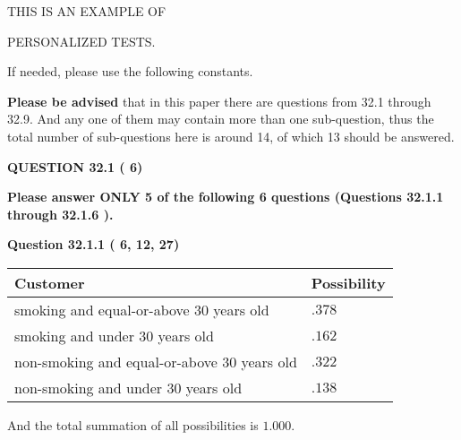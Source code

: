 \documentclass[12pt]{article}
\begin{document}
   
   
   
   
   
 \vspace{0.2in}
 
 
{\Huge  THIS IS AN EXAMPLE OF}
 
{\Huge  PERSONALIZED TESTS. }
 
If needed, please use the following constants.
 
 
 
{\textbf{\large{Please be advised}}} that in this paper there are questions from
32.1 through
32.9.
And any one of them may contain more than one sub-question, thus the total number
of sub-questions here is around 14, of which
13 should be answered.
 
\vspace{0.3in}
 
 
   
   
  
\vspace{0.2in}
  
{\textbf{\Large{QUESTION
32.1 
 (          6)
}}}
  
  
{\textbf{\Large{Please answer ONLY  %
           5 %
 of the following  %
           6 %
 questions (Questions  %
32.1.1 %
 through  %
32.1.6 %
 ). }}}
   
   
  
\vspace{0.2in}
  
{\textbf{\Large{Question
32.1.1 
 (          6,         12,         27)
}}}
  
  
 
 
\noindent{}

 
\noindent
\begin{tabular}{|l|l|}
\hline
Customer & Possibility \\
\hline
smoking  and  %
equal-or-above 30 years old &
  $ %
.378$ \\
\hline
smoking  and  %
under 30 years old &
  $ %
.162$ \\
\hline
 non-smoking and  %
equal-or-above 30 years old &
  $ %
.322$ \\
\hline
 non-smoking and  %
under 30 years old &
  $ %
.138$ \\
\hline
\end{tabular}
 
\noindent
 And the total summation of all possibilities is $  %
1.000 $.
 
\end{document}
